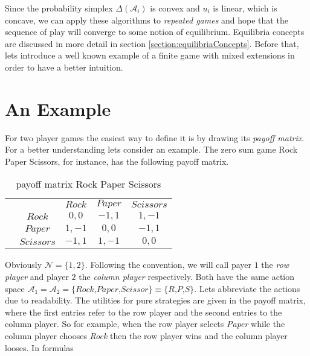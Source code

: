 Since the probability simplex $\Delta(\mathcal{A}_i)$ is convex and $u_i$ is linear, which is concave, we can apply these algorithms to \textit{repeated games} and hope that the sequence of play will converge to some notion of equilibrium. Equilibria concepts are discussed in more detail in section \ref{section:equilibriaConcepts}. Before that, lets introduce a well known example of a finite game with mixed extensions in order to have a better intuition. 


\section{An Example}\label{section:anExample}

For two player games the easiest way to define it is by drawing its \textit{payoff matrix}. For a better understanding lets consider an example. The zero sum game Rock Paper Scissors, for instance, has the following payoff matrix.\\

\begin{table}[H]\centering
\setlength{\extrarowheight}{2pt}
\begin{tabular}{cc|c|c|c|}
  & \multicolumn{1}{c}{} & \multicolumn{1}{c}{$Rock$}  & \multicolumn{1}{c}{$Paper$}  & \multicolumn{1}{c}{$Scissors$} \\\cline{3-5}
            & $Rock$ & $0,0$ & $-1,1$ & $1,-1$ \\ \cline{3-5}
            & $Paper$ & $1,-1$ & $0,0$ & $-1,1$ \\\cline{3-5}
            & $Scissors$ & $-1,1$ & $1,-1$ & $0,0$ \\\cline{3-5}
\end{tabular}\caption{\label{tab:payoffRPSFromDefinition}payoff matrix Rock Paper Scissors}
\end{table}

Obviously $\mathcal{N} = \{1,2\}$. Following the convention, we will call payer $1$ the \textit{row player} and player $2$ the \textit{column player} respectively. Both have the same action space $\mathcal{A}_1 = \mathcal{A}_2 = \{\textit{Rock,Paper,Scissor}\} \equiv \{\textit{R,P,S\}}$. Lets abbreviate the actions due to readability. The utilities for pure strategies are given in the payoff matrix, where the first entries refer to the row player and the second entries to the column player. So for example, when the row player selects \textit{Paper} while the column player chooses \textit{Rock} then the row player wins and the column player looses. In formulas

